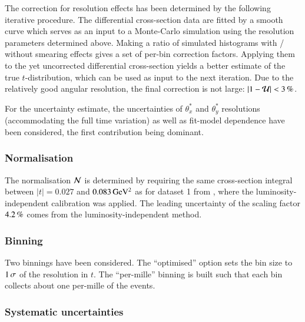 The correction for resolution effects has been determined by the following iterative procedure. The differential cross-section data are fitted by a smooth curve which serves as an input to a Monte-Carlo simulation using the resolution parameters determined above. Making a ratio of simulated histograms with / without smearing effects gives a set of per-bin correction factors. Applying them to the yet uncorrected differential cross-section yields a better estimate of the true $t$-distribution, which can be used as input to the next iteration. Due to the relatively good angular resolution, the final correction is not large: $|1 - {\cal U}| < 3\,{\rm \%}$.

For the uncertainty estimate, the uncertainties of $\theta_x^*$ and $\theta_y^*$ resolutions (accommodating the full time variation) as well as fit-model dependence have been considered, the first contribution being dominant.




\subsubsection{Normalisation}
\label{sec:normalisation}

The normalisation ${\cal N}$ is determined by requiring the same cross-section integral between $|t| = 0.027$ and $0.083\,{\rm GeV^2}$ as for dataset 1 from \cite{prl111}, where the luminosity-independent calibration was applied. The leading uncertainty of the scaling factor $4.2\,{\rm \%}$ comes from the luminosity-independent method.




\subsubsection{Binning}
\label{sec:binning}

Two binnings have been considered. The ``optimised'' option sets the bin size to $1\,{\rm \sigma}$ of the resolution in $t$. The ``per-mille'' binning is built such that each bin collects about one per-mille of the events.



\subsubsection{Systematic uncertainties}
\label{sec:systematics}


